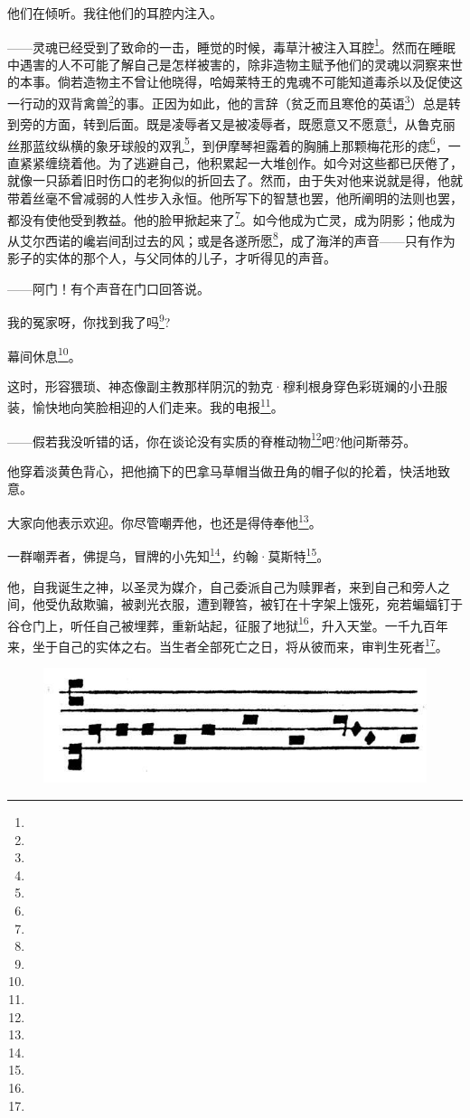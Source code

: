 \par 他们在倾听。我往他们的耳腔内注入。
\par ——灵魂已经受到了致命的一击，睡觉的时候，毒草汁被注入耳腔\footnote{}。然而在睡眠中遇害的人不可能了解自己是怎样被害的，除非造物主赋予他们的灵魂以洞察来世的本事。倘若造物主不曾让他晓得，哈姆莱特王的鬼魂不可能知道毒杀以及促使这一行动的双背禽兽\footnote{}的事。正因为如此，他的言辞（贫乏而且寒伧的英语\footnote{}）总是转到旁的方面，转到后面。既是凌辱者又是被凌辱者，既愿意又不愿意\footnote{}，从鲁克丽丝那蓝纹纵横的象牙球般的双乳\footnote{}，到伊摩琴袒露着的胸脯上那颗梅花形的痣\footnote{}，一直紧紧缠绕着他。为了逃避自己，他积累起一大堆创作。如今对这些都已厌倦了，就像一只舔着旧时伤口的老狗似的折回去了。然而，由于失对他来说就是得，他就带着丝毫不曾减弱的人性步入永恒。他所写下的智慧也罢，他所阐明的法则也罢，都没有使他受到教益。他的脸甲掀起来了\footnote{}。如今他成为亡灵，成为阴影；他成为从艾尔西诺的巉岩间刮过去的风；或是各遂所愿\footnote{}，成了海洋的声音——只有作为影子的实体的那个人，与父同体的儿子，才听得见的声音。
\par ——阿门！有个声音在门口回答说。
\par 我的冤家呀，你找到我了吗\footnote{}?
\par 幕间休息\footnote{}。
\par 这时，形容猥琐、神态像副主教那样阴沉的勃克·穆利根身穿色彩斑斓的小丑服装，愉快地向笑脸相迎的人们走来。我的电报\footnote{}。
\par ——假若我没听错的话，你在谈论没有实质的脊椎动物\footnote{}吧?他问斯蒂芬。
\par 他穿着淡黄色背心，把他摘下的巴拿马草帽当做丑角的帽子似的抡着，快活地致意。
\par 大家向他表示欢迎。你尽管嘲弄他，也还是得侍奉他\footnote{}。
\par 一群嘲弄者，佛提乌，冒牌的小先知\footnote{}，约翰·莫斯特\footnote{}。
\par 他，自我诞生之神，以圣灵为媒介，自己委派自己为赎罪者，来到自己和旁人之间，他受仇敌欺骗，被剥光衣服，遭到鞭笞，被钉在十字架上饿死，宛若蝙蝠钉于谷仓门上，听任自己被埋葬，重新站起，征服了地狱\footnote{}，升入天堂。一千九百年来，坐于自己的实体之右。当生者全部死亡之日，将从彼而来，审判生死者\footnote{}。
\begin{figure}[htb]
    \includegraphics[scale=0.4]{picture/尤利西斯1.jpeg}
\end{figure}
